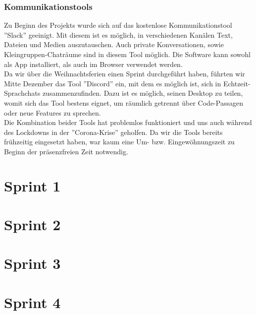 \documentclass[twoside]{report}
\begin{document}
\subsubsection{Kommunikationstools}
Zu Beginn des Projekts wurde sich auf das kostenlose Kommunikationstool ''Slack'' geeinigt.
Mit diesem ist es möglich, in verschiedenen Kanälen Text, Dateien und Medien auszutauschen.
Auch private Konversationen, sowie Kleingruppen-Chaträume sind in diesem Tool möglich.
Die Software kann sowohl als App installiert, als auch im Browser verwendet werden.
\\Da wir über die Weihnachtsferien einen Sprint durchgeführt haben, führten wir Mitte Dezember
das Tool ''Discord'' ein, mit dem es möglich ist, sich in Echtzeit-Sprachchats zusammenzufinden.
Dazu ist es möglich, seinen Desktop zu teilen, womit sich das Tool bestens eignet,
um räumlich getrennt über Code-Passagen oder neue Features zu sprechen.
\\Die Kombination beider Tools hat problemlos funktioniert und uns auch
während des Lockdowns in der ''Corona-Krise'' geholfen. Da wir die Tools bereits frühzeitig
eingesetzt haben, war kaum eine Um- bzw. Eingewöhnungszeit zu Beginn der
präsenzfreien Zeit notwendig.


\newpage


\section{Sprint 1}



\newpage

\section{Sprint 2}



\newpage

\section{Sprint 3}



\newpage

\section{Sprint 4}
\end{document}
